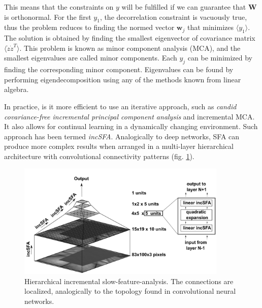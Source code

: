 \documentclass[oneside,english,logo]{amuthesis}
\begin{document}
This means that the constraints on $y$ will be fulfilled if we can guarantee that $\boldsymbol{W}$ is orthonormal.  For the first $y_1$, the decorrelation constraint is vacuously true, thus the problem reduces to finding the normed  vector $\boldsymbol{w}_j$ that minimizes $\langle y_1 \rangle$. The solution is obtained by finding the smallest eigenvector of covariance matrix $\langle \dot{z} \dot{z}^T \rangle$. This problem is known as minor component analysis (MCA), and the smallest eigenvalues are called minor components. Each $y_j$ can be minimized by finding the corresponding minor component. Eigenvalues can be found by performing eigendecomposition using any of the methods known from linear algebra. 

In practice, is it more efficient to use an iterative approach, such as \textit{candid covariance-free incremental principal component analysis} and incremental MCA. It also allows for continual learning in a dynamically changing environment. Such approach has been termed \textit{incSFA}. Analogically to deep networks, SFA can produce more complex results when arranged in a multi-layer hierarchical architecture with convolutional connectivity patterns (fig. \ref{fig:inc_sfa_hierarchy}).
\begin{figure}[!htbp]
	\centering
	\includegraphics[width=10cm]{inc_sfa_hierarchy}
	\caption{Hierarchical incremental slow-feature-analysis. The connections are localized, analogically to the topology found in convolutional neural networks.}
	\label{fig:inc_sfa_hierarchy}
\end{figure}
\end{document}
